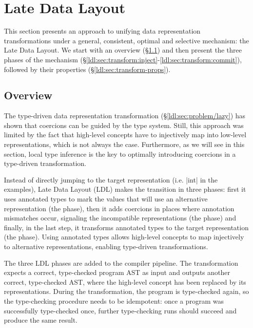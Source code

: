 \section{Late Data Layout}
\label{ldl:sec:transform}

This section presents an approach to unifying data representation transformations under a general, consistent, optimal and selective mechanism: the Late Data Layout. We start with an overview (\S\ref{ldl:sec:transform:how}) and then present the three phases of the mechanism (\S\ref{ldl:sec:transform:inject}-\ref{ldl:sec:transform:commit}), followed by their properties (\S\ref{ldl:sec:transform-props}).

\subsection{Overview}
\label{ldl:sec:transform:how}

The type-driven data representation transformation (\S\ref{ldl:sec:problem/lazy}) has shown that coercions can be guided by the type system. Still, this approach was limited by the fact that high-level concepts have to injectively map into low-level representations, which is not always the case. Furthermore, as we will see in this section, local type inference \cite{odersky-colored-local-type-inf} is the key to optimally introducing coercions in a type-driven transformation.

Instead of directly jumping to the target representation (i.e. |int| in the examples), Late Data Layout (LDL) makes the transition in three phases: first it uses annotated types to mark the values that will use an alternative representation (the \inject{} phase), then it adds coercions in places where annotation mismatches occur, signaling the incompatible representations (the \coerce{} phase) and finally, in the last step, it transforms annotated types to the target representation (the \commit{} phase). Using annotated types allows high-level concepts to map injectively to alternative representations, enabling type-driven transformations.

The three LDL phases are added to the compiler pipeline. The transformation expects a correct, type-checked program AST as input and outputs another correct, type-checked AST, where the high-level concept has been replaced by its representations. During the transformation, the program is type-checked again, so the type-checking procedure needs to be idempotent: once a program was successfully type-checked once, further type-checking runs should succeed and produce the same result.

